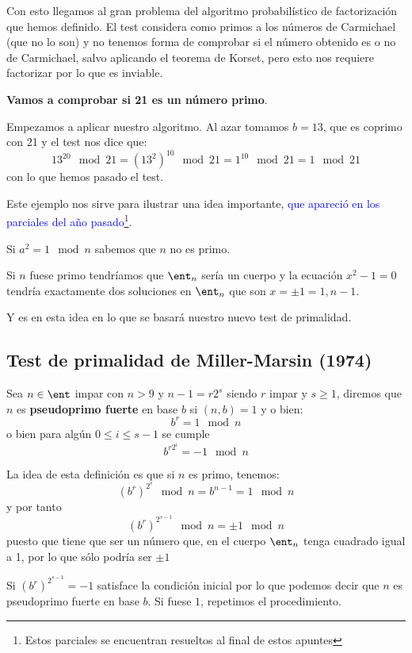 Con esto llegamos al gran problema del algoritmo probabilístico de factorización que hemos definido. El test considera como primos a los números de Carmichael (que no lo son) y no tenemos forma de comprobar si el número obtenido es o no de Carmichael, salvo aplicando el teorema de Korset, pero esto nos requiere factorizar por lo que es inviable.

\begin{example}
\textbf{Vamos a comprobar si 21 es un número primo}.

Empezamos a aplicar nuestro algoritmo. Al azar tomamos $b=13$, que es coprimo con 21 y el test nos dice que:
\[13^{20} \mod 21 = (13^2)^{10} \mod 21 =1^{10} \mod 21 =1 \mod 21\]
con lo que hemos pasado el test.
\end{example}

Este ejemplo nos sirve para ilustrar una idea importante, \textcolor{blue}{que apareció en los parciales del año pasado\footnote{Estos parciales se encuentran resueltos al final de estos apuntes}}.

\begin{mdframed}
Si $a^2 = 1 \mod n$ sabemos que $n$ no es primo.
\end{mdframed}

Si $n$ fuese primo tendríamos que $\ent_{n}$ sería un cuerpo y la ecuación $x^2-1 = 0 $ tendría exactamente dos soluciones en $\ent_{n}$ que son $x=\pm 1 = 1, n-1$.

Y es en esta idea en lo que se basará nuestro nuevo test de primalidad.

\subsection{Test de primalidad de Miller-Marsin (1974)}
\begin{defn}
Sea $n \in \ent$ impar con $n>9$ y $n-1=r2^s$ siendo $r$ impar y $s \geq 1$, diremos que $n$ es \textbf{pseudoprimo fuerte} en base $b$ si $(n,b)=1$ y o bien:
\[b^r=1 \mod n\]
o bien para algún $0 \leq i \leq s-1$ se cumple
\[b^{r2^i}=-1\mod n\]
\label{defn:MillerMarsinTest}
\end{defn}

La idea de esta definición es que si $n$ es primo, tenemos:
\[(b^r)^{2^s} \mod n=b^{n-1} = 1 \mod n\]
y por tanto
\[(b^r)^{2^{s-1}} \mod n = \pm 1 \mod n\]
puesto que tiene que ser un número que, en el cuerpo $\ent_n$ tenga cuadrado igual a 1, por lo que sólo podría ser $\pm 1$

Si $(b^r)^{2^{s-1}}=-1$ satisface la condición inicial por lo que podemos decir que $n$ es pseudoprimo fuerte en base $b$. Si fuese $1$, repetimos el procedimiento.

